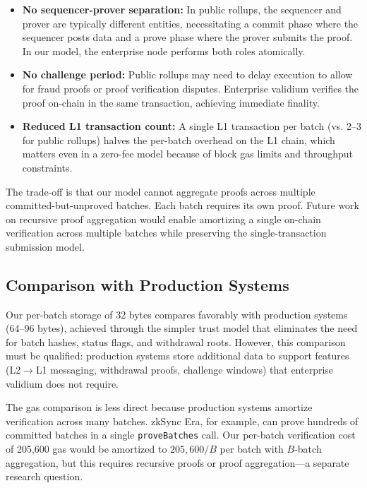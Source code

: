 \begin{itemize}
\item \textbf{No sequencer-prover separation:} In public rollups, the sequencer and prover
are typically different entities, necessitating a commit phase where the sequencer posts
data and a prove phase where the prover submits the proof. In our model, the enterprise
node performs both roles atomically.

\item \textbf{No challenge period:} Public rollups may need to delay execution to allow
for fraud proofs or proof verification disputes. Enterprise validium verifies the proof
on-chain in the same transaction, achieving immediate finality.

\item \textbf{Reduced L1 transaction count:} A single L1 transaction per batch (vs. 2--3
for public rollups) halves the per-batch overhead on the L1 chain, which matters even in
a zero-fee model because of block gas limits and throughput constraints.
\end{itemize}

The trade-off is that our model cannot aggregate proofs across multiple committed-but-unproved
batches. Each batch requires its own proof. Future work on recursive proof aggregation would
enable amortizing a single on-chain verification across multiple batches while preserving the
single-transaction submission model.

\subsection{Comparison with Production Systems}

Our per-batch storage of 32 bytes compares favorably with production systems (64--96 bytes),
achieved through the simpler trust model that eliminates the need for batch hashes, status
flags, and withdrawal roots. However, this comparison must be qualified: production systems
store additional data to support features (L2$\to$L1 messaging, withdrawal proofs,
challenge windows) that enterprise validium does not require.

The gas comparison is less direct because production systems amortize verification across
many batches. zkSync Era, for example, can prove hundreds of committed batches in a single
\texttt{proveBatches} call. Our per-batch verification cost of 205,600 gas would be
amortized to $205{,}600 / B$ per batch with $B$-batch aggregation, but this requires
recursive proofs or proof aggregation---a separate research question.

